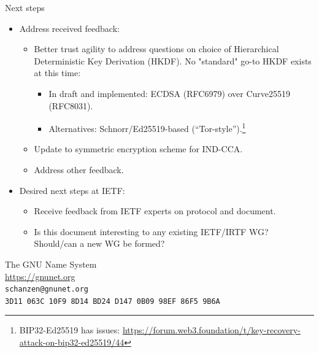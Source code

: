 \documentclass[aspectratio=169]{beamer}
\begin{document}
\begin{frame}{Next steps}
  \begin{itemize}
    \item Address received feedback:
      \begin{itemize}
        \item Better trust agility to address questions on choice of Hierarchical Deterministic Key Derivation (HKDF). No "standard" go-to HKDF exists at this time:
          \begin{itemize}
            \item In draft and implemented: ECDSA (RFC6979) over Curve25519 (RFC8031).
            \item Alternatives: Schnorr/Ed25519-based (``Tor-style'').\footnote{BIP32-Ed25519 has issues: \url{https://forum.web3.foundation/t/key-recovery-attack-on-bip32-ed25519/44}}
          \end{itemize}
        \item Update to symmetric encryption scheme for IND-CCA.
        \item Address other feedback.
      \end{itemize}
    \item Desired next steps at IETF:
  \begin{itemize}
    \item Receive feedback from IETF experts on protocol and document.
    \item Is this document interesting to any existing IETF/IRTF WG? Should/can a new WG be formed?
  \end{itemize}
  \end{itemize}
\end{frame}



\begin{frame}
  \begin{center}
    The GNU Name System\\
    \vspace{2cm}
    \url{https://gnunet.org}\\
    \vspace{1em}
    {\tiny
    \texttt{schanzen@gnunet.org}\\
    \texttt{3D11~063C~10F9~8D14~BD24~D147~0B09~98EF~86F5~9B6A}\\
    }
  \end{center}
\end{frame}

\appendix
\end{document}
